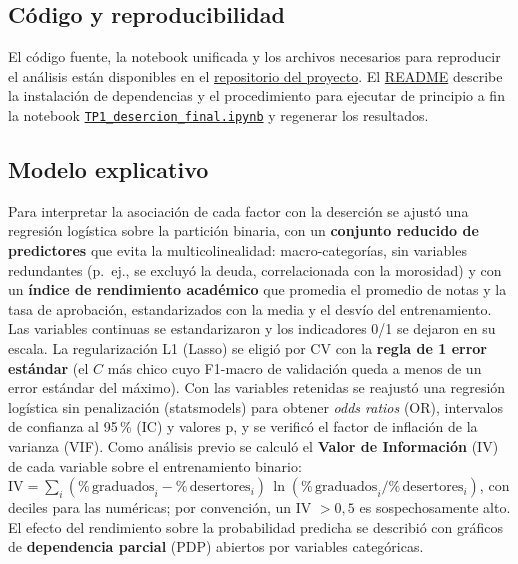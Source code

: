 \documentclass[titlepage,a4paper]{article}
\newcommand{\code}[1]{\texttt{#1}}
\begin{document}
\subsection{Código y reproducibilidad}

El código fuente, la notebook unificada y los archivos necesarios para reproducir el análisis están disponibles en el \href{https://github.com/diegorojasucv/tp-1-aa}{repositorio del proyecto}. El \href{https://github.com/diegorojasucv/tp-1-aa/blob/main/README.md}{README} describe la instalación de dependencias y el procedimiento para ejecutar de principio a fin la notebook \href{https://github.com/diegorojasucv/tp-1-aa/blob/main/notebooks/TP1_desercion_final.ipynb}{\code{TP1\_desercion\_final.ipynb}} y regenerar los resultados.

\subsection{Modelo explicativo}\label{sec:met_explicativo}

Para interpretar la asociación de cada factor con la deserción se ajustó una regresión logística sobre la partición binaria, con un \textbf{conjunto reducido de predictores} que evita la multicolinealidad: macro-categorías, sin variables redundantes (p.\ ej., se excluyó la deuda, correlacionada con la morosidad) y con un \textbf{índice de rendimiento académico} que promedia el promedio de notas y la tasa de aprobación, estandarizados con la media y el desvío del entrenamiento. Las variables continuas se estandarizaron y los indicadores 0/1 se dejaron en su escala. La regularización L1 (Lasso) se eligió por CV con la \textbf{regla de 1 error estándar} (el $C$ más chico cuyo F1-macro de validación queda a menos de un error estándar del máximo). Con las variables retenidas se reajustó una regresión logística sin penalización (statsmodels) para obtener \textit{odds ratios} (OR), intervalos de confianza al 95\,\% (IC) y valores p, y se verificó el factor de inflación de la varianza (VIF). Como análisis previo se calculó el \textbf{Valor de Información} (IV) de cada variable sobre el entrenamiento binario: $\mathrm{IV} = \sum_i (\%\,\text{graduados}_i - \%\,\text{desertores}_i)\,\ln(\%\,\text{graduados}_i / \%\,\text{desertores}_i)$, con deciles para las numéricas; por convención, un IV $> 0{,}5$ es sospechosamente alto. El efecto del rendimiento sobre la probabilidad predicha se describió con gráficos de \textbf{dependencia parcial} (PDP) abiertos por variables categóricas.
\end{document}
